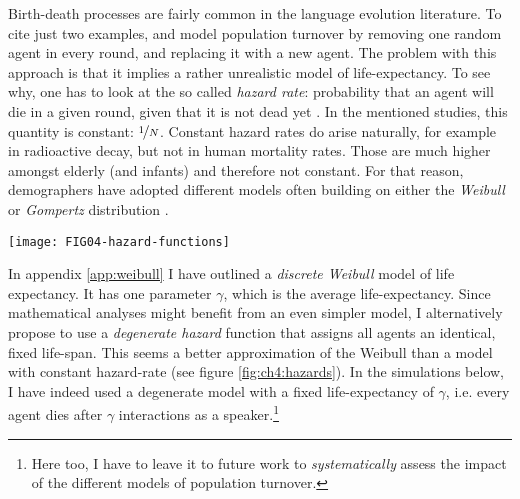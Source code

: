 \documentclass{../src/bcthesispart}
\begin{document}
Birth-death processes are fairly common in the language evolution literature.
To cite just two examples, \textcite{DeBoer1999} and \textcite{Smith2002} model population turnover by removing one random agent in every round, and replacing it with a new agent.
The problem with this approach is that it implies a rather unrealistic model of life-expectancy.
To see why, one has to look at the so called \emph{hazard rate}: probability that an agent will die in a given round, given that it is not dead yet \parencite{Rodriguez2007}.
In the mentioned studies, this quantity is constant: $\nicefrac{1}{N}$.
Constant hazard rates do arise naturally, for example in radioactive decay, but not in human mortality rates.
Those are much higher amongst elderly (and infants) and therefore not constant.
For that reason, demographers have adopted different models often building on either the \emph{Weibull} or \emph{Gompertz} distribution \parencite{Juckett1993}.


\begin{SCfigure}\footnotesize
	\texttt{[image: FIG04-hazard-functions]}

	\caption{%
	Different hazard functions.
	The more realistic (continuous/discrete) Weibull hazard is better approximated by a degenerate than a constant hazard function.
	\label{fig:ch4:hazards}}
\end{SCfigure}



In appendix \ref{app:weibull} I have outlined a \emph{discrete Weibull} model of life expectancy.
It has one parameter $\gamma$, which is the average life-expectancy.
Since mathematical analyses might benefit from an even simpler model, I alternatively propose to use a \emph{degenerate hazard} function that assigns all agents an identical, fixed life-span.
This seems a better approximation of the Weibull than a model with constant hazard-rate (see figure \ref{fig:ch4:hazards}).
In the simulations below, I have indeed used a degenerate model with a fixed life-expectancy of $\gamma$, i.e. every agent dies after $\gamma$ interactions as a speaker.\footnote{%
	Here too, I have to leave it to future work to \emph{systematically} assess the impact of the different models of population turnover.
	}






\end{document}
